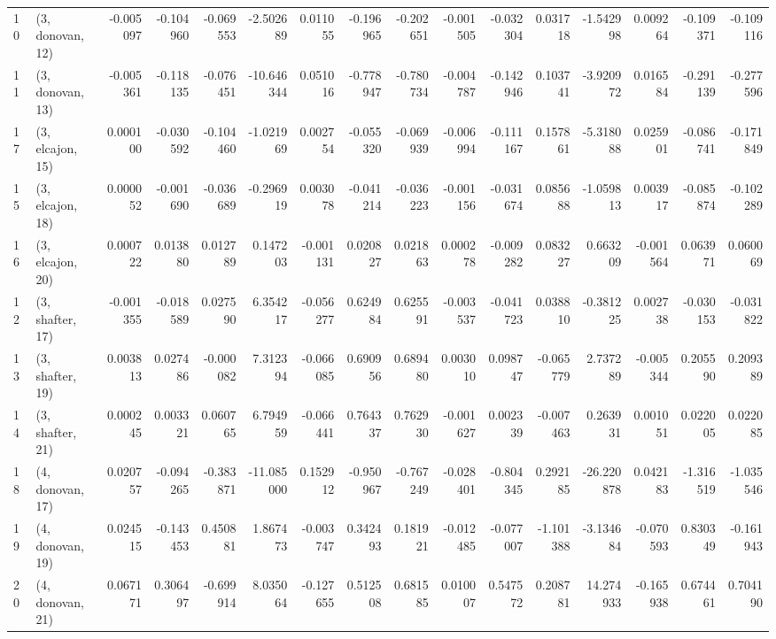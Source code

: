 \begin{tabular}{llrrrrrrrrrrrrrr}
10 &  (3, donovan, 12) &  -0.005097 & -0.104960 & -0.069553 &  -2.502689 &  0.011055 &  -0.196965 & -0.202651 & -0.001505 & -0.032304 &  0.031718 &  -1.542998 &  0.009264 & -0.109371 & -0.109116 \\
11 &  (3, donovan, 13) &  -0.005361 & -0.118135 & -0.076451 & -10.646344 &  0.051016 &  -0.778947 & -0.780734 & -0.004787 & -0.142946 &  0.103741 &  -3.920972 &  0.016584 & -0.291139 & -0.277596 \\
17 &  (3, elcajon, 15) &   0.000100 & -0.030592 & -0.104460 &  -1.021969 &  0.002754 &  -0.055320 & -0.069939 & -0.006994 & -0.111167 &  0.157861 &  -5.318088 &  0.025901 & -0.086741 & -0.171849 \\
15 &  (3, elcajon, 18) &   0.000052 & -0.001690 & -0.036689 &  -0.296919 &  0.003078 &  -0.041214 & -0.036223 & -0.001156 & -0.031674 &  0.085688 &  -1.059813 &  0.003917 & -0.085874 & -0.102289 \\
16 &  (3, elcajon, 20) &   0.000722 &  0.013880 &  0.012789 &   0.147203 & -0.001131 &   0.020827 &  0.021863 &  0.000278 & -0.009282 &  0.083227 &   0.663209 & -0.001564 &  0.063971 &  0.060069 \\
12 &  (3, shafter, 17) &  -0.001355 & -0.018589 &  0.027590 &   6.354217 & -0.056277 &   0.624984 &  0.625591 & -0.003537 & -0.041723 &  0.038810 &  -0.381225 &  0.002738 & -0.030153 & -0.031822 \\
13 &  (3, shafter, 19) &   0.003813 &  0.027486 & -0.000082 &   7.312394 & -0.066085 &   0.690956 &  0.689480 &  0.003010 &  0.098747 & -0.065779 &   2.737289 & -0.005344 &  0.205590 &  0.209389 \\
14 &  (3, shafter, 21) &   0.000245 &  0.003321 &  0.060765 &   6.794959 & -0.066441 &   0.764337 &  0.762930 & -0.001627 &  0.002339 & -0.007463 &   0.263931 &  0.001051 &  0.022005 &  0.022085 \\
18 &  (4, donovan, 17) &   0.020757 & -0.094265 & -0.383871 & -11.085000 &  0.152912 &  -0.950967 & -0.767249 & -0.028401 & -0.804345 &  0.292185 & -26.220878 &  0.042183 & -1.316519 & -1.035546 \\
19 &  (4, donovan, 19) &   0.024515 & -0.143453 &  0.450881 &   1.867473 & -0.003747 &   0.342493 &  0.181921 & -0.012485 & -0.077007 & -1.101388 &  -3.134684 & -0.070593 &  0.830349 & -0.161943 \\
20 &  (4, donovan, 21) &   0.067171 &  0.306497 & -0.699914 &   8.035064 & -0.127655 &   0.512508 &  0.681585 &  0.010007 &  0.547572 &  0.208781 &  14.274933 & -0.165938 &  0.674461 &  0.704190 \\

\end{tabular}
